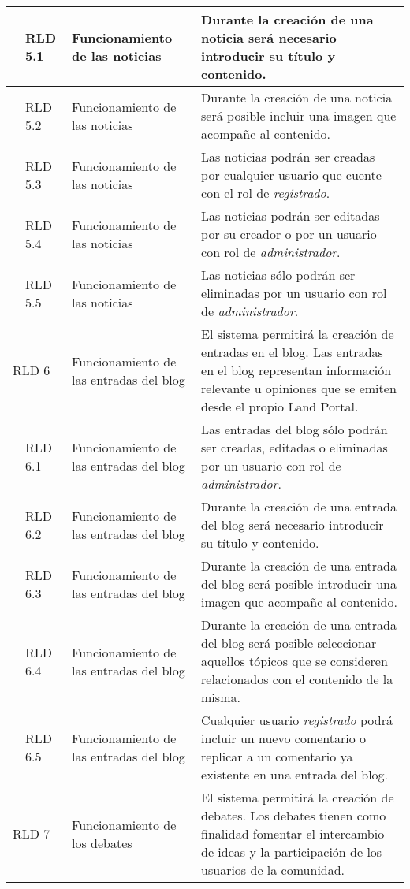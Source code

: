 \begin{longtable}[c]{|p{1mm}|p{14mm}|p{30mm}|p{90mm}|}
& RLD 5.1 & Funcionamiento de las noticias & Durante la creación de una noticia será necesario introducir su título y contenido. \\
\hline
& RLD 5.2 & Funcionamiento de las noticias & Durante la creación de una noticia será posible incluir una imagen que acompañe al contenido. \\
\hline
& RLD 5.3 & Funcionamiento de las noticias & Las noticias podrán ser creadas por cualquier usuario que cuente con el rol de \textit{registrado}. \\
\hline
& RLD 5.4 & Funcionamiento de las noticias & Las noticias podrán ser editadas por su creador o por un usuario con rol de \textit{administrador}. \\
\hline
& RLD 5.5 & Funcionamiento de las noticias & Las noticias sólo podrán ser eliminadas por un usuario con rol de \textit{administrador}. \\
\hline
\multicolumn{2}{|l|}{RLD 6} & Funcionamiento de las entradas del blog & El sistema permitirá la creación de entradas en el blog.  Las entradas en el blog representan información relevante u opiniones que se emiten desde el propio Land Portal. \\
\hline
& RLD 6.1 & Funcionamiento de las entradas del blog & Las entradas del blog sólo podrán ser creadas, editadas o eliminadas por un usuario con rol de \textit{administrador}. \\
\hline
& RLD 6.2 & Funcionamiento de las entradas del blog & Durante la creación de una entrada del blog será necesario introducir su título y contenido. \\
\hline
& RLD 6.3 & Funcionamiento de las entradas del blog & Durante la creación de una entrada del blog será posible introducir una imagen que acompañe al contenido. \\
\hline
& RLD 6.4 & Funcionamiento de las entradas del blog & Durante la creación de una entrada del blog será posible seleccionar aquellos tópicos que se consideren relacionados con el contenido de la misma. \\
\hline
& RLD 6.5 & Funcionamiento de las entradas del blog & Cualquier usuario \textit{registrado} podrá incluir un nuevo comentario o replicar a un comentario ya existente en una entrada del blog. \\
\hline
\multicolumn{2}{|l|}{RLD 7} & Funcionamiento de los debates & El sistema permitirá la creación de debates.  Los debates tienen como finalidad fomentar el intercambio de ideas y la participación de los usuarios de la comunidad. \\

\end{longtable}
